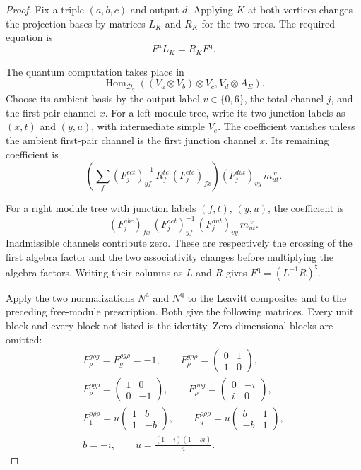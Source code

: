 \begin{proof}
Fix a triple $(a,b,c)$ and output $d$. Applying $K$ at both vertices
changes the projection bases by matrices $L_K$ and $R_K$ for the two trees.
The required equation is
\begin{equation}\label{v4-arith:asi:all-f-comparison}
 F^{\mathrm a}L_K=R_KF^{\mathrm q}.
\end{equation}


The quantum computation takes place in
\[
 \operatorname{Hom}_{\mathcal D_q}
       ((V_a\otimes V_b)\otimes V_c,V_d\otimes A_E).
\]
Choose its ambient basis by the output label \(v\in\{0,6\}\),
the total channel \(j\), and the first-pair channel \(x\).
For a left module tree, write its two junction labels as
\((x,t)\) and \((y,u)\), with intermediate simple \(V_e\).
The coefficient vanishes unless the ambient first-pair channel
is the first junction channel \(x\). Its remaining coefficient is
\[
 \left(\sum_f
    (F^{ect}_j)^{-1}_{yf}\,R^{tc}_f\,(F^{etc}_j)_{fx}\right)
       (F^{dut}_j)_{vy}\,m_{ut}^{\,v}.
\]

For a right module tree with junction labels \((f,t)\),
\((y,u)\), the coefficient is
\[
 (F^{abc}_j)_{fx}\,(F^{aet}_j)^{-1}_{yf}\,
       (F^{dut}_j)_{vy}\,m_{ut}^{\,v}.
\]
Inadmissible channels contribute zero. These are respectively
the crossing of the first algebra factor and the two
associativity changes before multiplying the algebra factors.
Writing their columns as \(L\) and \(R\) gives
\(F^{\mathrm q}=(L^{-1}R)^{\mathsf t}\).

Apply the two normalizations $N^{\mathrm a}$ and $N^{\mathrm q}$ to the Leavitt
composites and to the preceding free-module prescription. Both give
the following matrices. Every unit block and every block not listed
is the identity. Zero-dimensional blocks are omitted:
\[
\begin{gathered}
 F^{g\rho g}_\rho=F^{\rho g\rho}_g=-1,\qquad
 F^{g\rho\rho}_\rho=\begin{pmatrix}0&1\\1&0\end{pmatrix},\\
 F^{\rho g\rho}_\rho=\begin{pmatrix}1&0\\0&-1\end{pmatrix},\qquad
 F^{\rho\rho g}_\rho=\begin{pmatrix}0&-i\\i&0\end{pmatrix},\\
 F^{\rho\rho\rho}_1=u\begin{pmatrix}1&b\\1&-b\end{pmatrix},\qquad
 F^{\rho\rho\rho}_g=u\begin{pmatrix}b&1\\-b&1\end{pmatrix},\\
 b=-i,\qquad u=\frac{(1-i)(1-si)}4.
\end{gathered}
\]



\end{proof}
